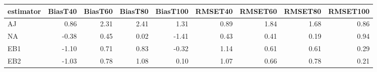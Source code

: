 \begin{table}[ht]
\centering
\begin{tabular}{lrrrrrrrr}
  \toprule
estimator & BiasT40 & BiasT60 & BiasT80 & BiasT100 & RMSET40 & RMSET60 & RMSET80 & RMSET100 \\ 
  \midrule
AJ & 0.86 & 2.31 & 2.41 & 1.31 & 0.89 & 1.84 & 1.68 & 0.86 \\ 
  NA & -0.38 & 0.45 & 0.02 & -1.41 & 0.43 & 0.41 & 0.19 & 0.94 \\ 
  EB1 & -1.10 & 0.71 & 0.83 & -0.32 & 1.14 & 0.61 & 0.61 & 0.29 \\ 
  EB2 & -1.03 & 0.78 & 1.08 & 0.10 & 1.07 & 0.66 & 0.78 & 0.21 \\ 
   \bottomrule
\end{tabular}
\end{table}
